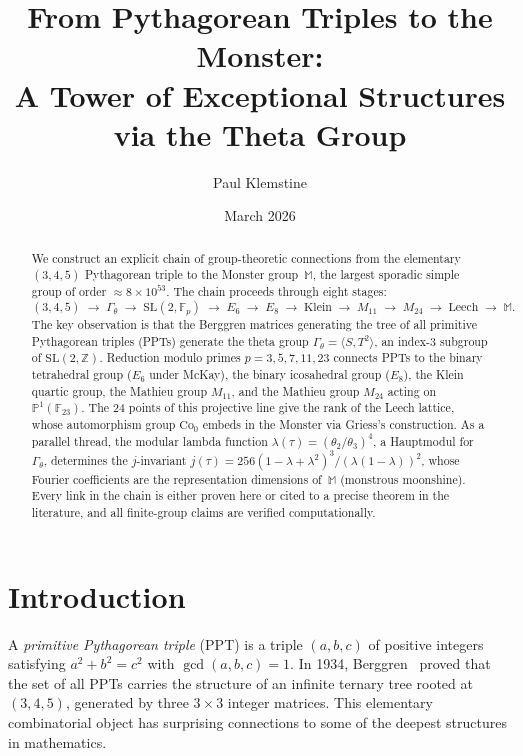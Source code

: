 \documentclass[12pt]{amsart}
\title{From Pythagorean Triples to the Monster:\\
A Tower of Exceptional Structures via the Theta Group}
\author{Paul Klemstine}
\date{March 2026}
\theoremstyle{definition}
\theoremstyle{remark}
\newcommand{\SL}{\mathrm{SL}}
\newcommand{\Fp}{\mathbb{F}_p}
\newcommand{\Z}{\mathbb{Z}}
\newcommand{\PP}{\mathbb{P}}
\newcommand{\Gtheta}{\Gamma_\theta}
\newcommand{\Monster}{\mathbb{M}}
\begin{document}
\begin{abstract}
We construct an explicit chain of group-theoretic connections from
the elementary $(3,4,5)$ Pythagorean triple to the Monster group~$\Monster$,
the largest sporadic simple group of order $\approx 8\times 10^{53}$.
The chain proceeds through eight stages:
\[
(3,4,5) \;\to\; \Gtheta \;\to\; \SL(2,\Fp)
\;\to\; E_6 \;\to\; E_8 \;\to\; \text{Klein} \;\to\;
M_{11} \;\to\; M_{24} \;\to\; \text{Leech} \;\to\; \Monster.
\]
The key observation is that the Berggren matrices generating the tree of
all primitive Pythagorean triples (PPTs) generate the theta group
$\Gtheta = \langle S, T^2\rangle$, an index-3 subgroup of $\SL(2,\Z)$.
Reduction modulo primes $p = 3, 5, 7, 11, 23$ connects PPTs to the
binary tetrahedral group ($E_6$ under McKay), the binary icosahedral
group ($E_8$), the Klein quartic group, the Mathieu group $M_{11}$,
and the Mathieu group $M_{24}$ acting on $\PP^1(\mathbb{F}_{23})$.
The 24 points of this projective line give the rank of the Leech lattice,
whose automorphism group $\mathrm{Co}_0$ embeds in the Monster via
Griess's construction.  As a parallel thread, the modular lambda function
$\lambda(\tau) = (\theta_2/\theta_3)^4$, a Hauptmodul for~$\Gtheta$,
determines the $j$-invariant $j(\tau) = 256(1-\lambda+\lambda^2)^3/
(\lambda(1-\lambda))^2$, whose Fourier coefficients are the
representation dimensions of~$\Monster$ (monstrous moonshine).
Every link in the chain is either proven here or cited to a precise
theorem in the literature, and all finite-group claims are verified
computationally.
\end{abstract}

\maketitle

\tableofcontents

\section{Introduction}\label{sec:intro}

A \emph{primitive Pythagorean triple} (PPT) is a triple $(a,b,c)$ of
positive integers satisfying $a^2 + b^2 = c^2$ with $\gcd(a,b,c) = 1$.
In 1934, Berggren~\cite{berggren} proved that the set of all PPTs carries
the structure of an infinite ternary tree rooted at $(3,4,5)$, generated
by three $3\times 3$ integer matrices.  This elementary combinatorial
object has surprising connections to some of the deepest structures in
mathematics.
\end{document}
